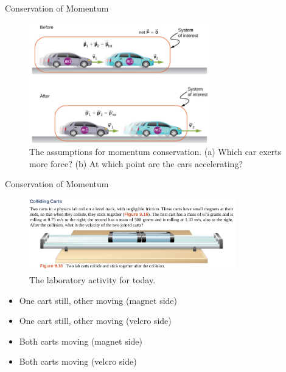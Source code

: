 \documentclass{beamer}
\begin{document}
\begin{frame}{Conservation of Momentum}
\begin{figure}
\centering
\includegraphics[width=0.7\textwidth]{figures/cars.png}
\caption{\label{fig:cars} The assumptions for momentum conservation.  (a) Which car exerts more force? (b) At which point are the cars accelerating?}
\end{figure}
\end{frame}

\begin{frame}{Conservation of Momentum}
\begin{figure}
\centering
\includegraphics[width=0.8\textwidth]{figures/carts.png}
\caption{\label{fig:carts} The laboratory activity for today.}
\end{figure}
\small
\begin{itemize}
\item One cart still, other moving (magnet side)
\item One cart still, other moving (velcro side)
\item Both carts moving (magnet side)
\item Both carts moving (velcro side)
\end{itemize}
\end{frame}
\end{document}
